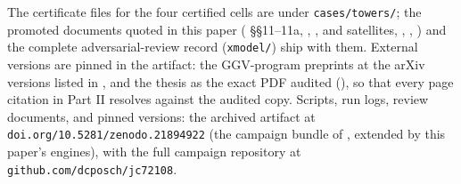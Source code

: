 \documentclass[11pt]{article}
\theoremstyle{definition}
\theoremstyle{remark}
\begin{document}
The certificate files for the four certified cells are under \texttt{cases/towers/}; the promoted documents quoted in this paper ( \S\S11--11a, , ,  and satellites, , , ) and the complete adversarial-review record (\texttt{xmodel/}) ship with them. External versions are pinned in the artifact: the GGV-program preprints at the arXiv versions listed in \cite{P1}, and the thesis \cite{Sigray} as the exact PDF audited (), so that every page citation in Part II resolves against the audited copy. Scripts, run logs, review documents, and pinned versions: the archived artifact at \texttt{doi.org/10.5281/zenodo.21894922} (the campaign bundle of \cite{P1}, extended by this paper's engines), with the full campaign repository at \texttt{github.com/dcposch/jc72108}.
\end{document}
